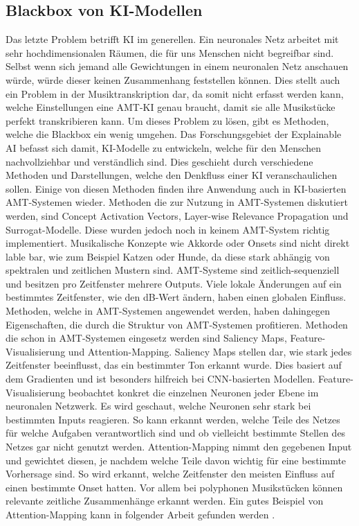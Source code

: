 \subsection{Blackbox von KI-Modellen}
Das letzte Problem betrifft KI im generellen.
Ein neuronales Netz arbeitet mit sehr hochdimensionalen Räumen, die für uns Menschen nicht begreifbar sind.
Selbst wenn sich jemand alle Gewichtungen in einem neuronalen Netz anschauen würde,
würde dieser keinen Zusammenhang feststellen können.
Dies stellt auch ein Problem in der Musiktranskription dar, da somit nicht erfasst werden kann,
welche Einstellungen eine AMT-KI genau braucht,
damit sie alle Musikstücke perfekt transkribieren kann.
Um dieses Problem zu lösen, gibt es Methoden, welche die Blackbox ein wenig umgehen.
Das Forschungsgebiet der Explainable AI befasst sich damit,
KI-Modelle zu entwickeln, welche für den Menschen nachvollziehbar und verständlich sind.
Dies geschieht durch verschiedene Methoden und Darstellungen, welche den Denkfluss einer KI veranschaulichen sollen.
Einige von diesen Methoden finden ihre Anwendung auch in KI-basierten AMT-Systemen wieder.
Methoden die zur Nutzung in AMT-Systemen diskutiert werden, sind Concept Activation Vectors,
Layer-wise Relevance Propagation und Surrogat-Modelle.
Diese wurden jedoch noch in keinem AMT-System richtig implementiert.
Musikalische Konzepte wie Akkorde oder Onsets sind nicht direkt lable bar, wie zum Beispiel Katzen oder Hunde,
da diese stark abhängig von spektralen und zeitlichen Mustern sind.
AMT-Systeme sind zeitlich-sequenziell und besitzen pro Zeitfenster mehrere Outputs.
Viele lokale Änderungen auf ein bestimmtes Zeitfenster, wie den dB-Wert ändern, haben einen globalen Einfluss.
Methoden, welche in AMT-Systemen angewendet werden,
haben dahingegen Eigenschaften, die durch die Struktur von AMT-Systemen profitieren.
Methoden die schon in AMT-Systemen eingesetz werden sind Saliency Maps, Feature-Visualisierung und Attention-Mapping.
Saliency Maps stellen dar, wie stark jedes Zeitfenster beeinflusst, das ein bestimmter Ton erkannt wurde.
Dies basiert auf dem Gradienten und ist besonders hilfreich bei CNN-basierten Modellen.
Feature-Visualisierung beobachtet konkret die einzelnen Neuronen jeder Ebene im neuronalen Netzwerk.
Es wird geschaut, welche Neuronen sehr stark bei bestimmten Inputs reagieren.
So kann erkannt werden, welche Teile des Netzes für welche Aufgaben verantwortlich sind
und ob vielleicht bestimmte Stellen des Netzes gar nicht genutzt werden.
Attention-Mapping nimmt den gegebenen Input und gewichtet diesen,
je nachdem welche Teile davon wichtig für eine bestimmte Vorhersage sind.
So wird erkannt, welche Zeitfenster den meisten Einfluss auf einen bestimmte Onset hatten.
Vor allem bei polyphonen Musikstücken können relevante zeitliche Zusammenhänge erkannt werden.
Ein gutes Beispiel von Attention-Mapping kann in folgender Arbeit gefunden werden \cite{cheuk2021revisiting}.
